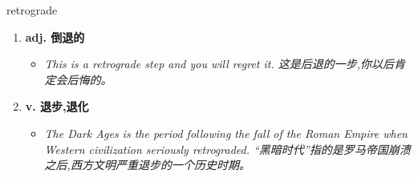 
\begin{frame}
{\huge retrograde}
\begin{center}
\begin{enumerate}\Large
  \item \textbf{adj. 倒退的}
  \begin{itemize}
    \item \em{\Large{This is a retrograde step and you will regret it. 这是后退的一步,你以后肯定会后悔的。}}
  \end{itemize}
  \item \textbf{v. 退步,退化}
  \begin{itemize}
    \item \em{\Large{The Dark Ages is the period following the fall of the Roman Empire when Western civilization seriously retrograded. “黑暗时代”指的是罗马帝国崩溃之后,西方文明严重退步的一个历史时期。}}
  \end{itemize}
\end{enumerate}
\end{center}
\end{frame}
